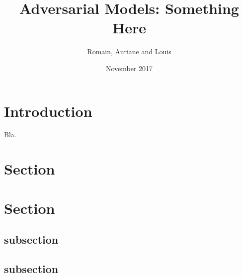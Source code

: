 \documentclass{article}
\title{Adversarial Models: Something Here}
\author{Romain, Auriane and Louis}
\date{November 2017}
\begin{document}
\maketitle

\section{Introduction}
Bla.
\section{Section}
\section{Section}
\subsection{subsection}
\subsection{subsection}
\end{document}
